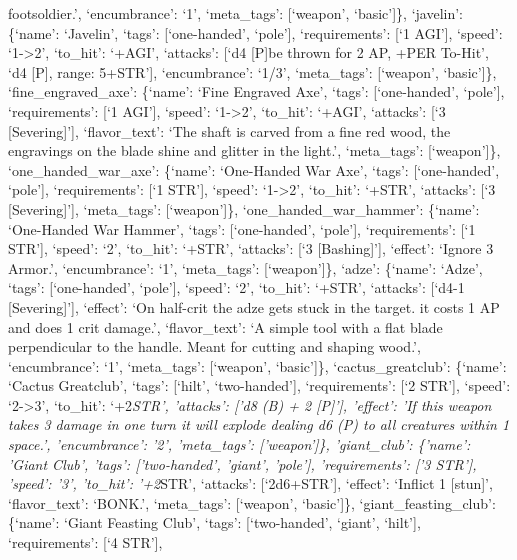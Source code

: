 \documentclass[
  letterpaper,
  DIV=11,
  numbers=noendperiod]{scrartcl}
\begin{document}
footsoldier.', `encumbrance': `1', `meta\_tags': {[}`weapon',
`basic'{]}\}, `javelin': \{`name': `Javelin', `tags': {[}`one-handed',
`pole'{]}, `requirements': {[}`1 AGI'{]}, `speed': `1-\textgreater2',
`to\_hit': `+AGI', `attacks': {[}`d4 {[}P{]}\nCan be thrown for 2 AP,
+PER To-Hit', `d4 {[}P{]}, range: 5+STR'{]}, `encumbrance': `1/3',
`meta\_tags': {[}`weapon', `basic'{]}\}, `fine\_engraved\_axe':
\{`name': `Fine Engraved Axe', `tags': {[}`one-handed', `pole'{]},
`requirements': {[}`1 AGI'{]}, `speed': `1-\textgreater2', `to\_hit':
`+AGI', `attacks': {[}`3 {[}Severing{]}'{]}, `flavor\_text': `The shaft
is carved from a fine red wood, the engravings on the blade shine and
glitter in the light.', `meta\_tags': {[}`weapon'{]}\},
`one\_handed\_war\_axe': \{`name': `One-Handed War Axe', `tags':
{[}`one-handed', `pole'{]}, `requirements': {[}`1 STR'{]}, `speed':
`1-\textgreater2', `to\_hit': `+STR', `attacks': {[}`3
{[}Severing{]}'{]}, `meta\_tags': {[}`weapon'{]}\},
`one\_handed\_war\_hammer': \{`name': `One-Handed War Hammer', `tags':
{[}`one-handed', `pole'{]}, `requirements': {[}`1 STR'{]}, `speed': `2',
`to\_hit': `+STR', `attacks': {[}`3 {[}Bashing{]}'{]}, `effect': `Ignore
3 Armor.', `encumbrance': `1', `meta\_tags': {[}`weapon'{]}\}, `adze':
\{`name': `Adze', `tags': {[}`one-handed', `pole'{]}, `speed': `2',
`to\_hit': `+STR', `attacks': {[}`d4-1 {[}Severing{]}'{]}, `effect': `On
half-crit the adze gets stuck in the target. \nRemoving it costs 1 AP
and does 1 crit damage.', `flavor\_text': `A simple tool with a flat
blade perpendicular to the handle. Meant for cutting and shaping wood.',
`encumbrance': `1', `meta\_tags': {[}`weapon', `basic'{]}\},
`cactus\_greatclub': \{`name': `Cactus Greatclub', `tags': {[}`hilt',
`two-handed'{]}, `requirements': {[}`2 STR'{]}, `speed':
`2-\textgreater3', `to\_hit': `+2\emph{STR', 'attacks': {[}'d8 (B) + 2
{[}P{]}'{]}, 'effect': 'If this weapon takes 3 damage in one turn it
will explode dealing d6 (P) to all creatures within 1 space.',
'encumbrance': '2', 'meta\_tags': {[}'weapon'{]}\}, 'giant\_club':
\{'name': 'Giant Club', 'tags': {[}'two-handed', 'giant', 'pole'{]},
'requirements': {[}'3 STR'{]}, 'speed': '3', 'to\_hit': '+2}STR',
`attacks': {[}`2d6+STR'{]}, `effect': `Inflict 1 {[}stun{]}',
`flavor\_text': `BONK.', `meta\_tags': {[}`weapon', `basic'{]}\},
`giant\_feasting\_club': \{`name': `Giant Feasting Club', `tags':
{[}`two-handed', `giant', `hilt'{]}, `requirements': {[}`4 STR'{]},
\end{document}

